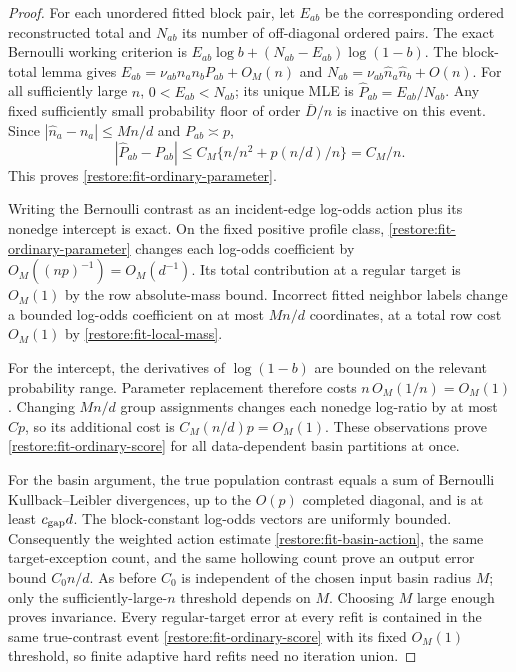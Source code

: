 \begin{proof}
For each unordered fitted block pair, let $E_{ab}$ be the corresponding
ordered reconstructed total and $N_{ab}$ its number of off-diagonal
ordered pairs. The exact Bernoulli working criterion is
$E_{ab}\log b+(N_{ab}-E_{ab})\log(1-b)$.
The block-total lemma gives
$E_{ab}=\nu_{ab}n_an_bP_{ab}+O_M(n)$ and
$N_{ab}=\nu_{ab}\widehat n_a\widehat n_b+O(n)$.
For all sufficiently large $n$, $0<E_{ab}<N_{ab}$; its unique MLE is
$\widehat P_{ab}=E_{ab}/N_{ab}$.
Any fixed sufficiently small probability floor of order $\overline D/n$
is inactive on this event. Since
$|\widehat n_a-n_a|\le Mn/d$ and $P_{ab}\asymp p$,
\[
 |\widehat P_{ab}-P_{ab}|
 \le C_M\{n/n^2+p(n/d)/n\}=C_M/n.
\]
This proves \eqref{restore:fit-ordinary-parameter}.

Writing the Bernoulli contrast as an incident-edge log-odds action
plus its nonedge intercept is exact. On the fixed positive profile
class, \eqref{restore:fit-ordinary-parameter} changes each log-odds
coefficient by $O_M((np)^{-1})=O_M(d^{-1})$.
Its total contribution at a regular target is $O_M(1)$ by the row
absolute-mass bound. Incorrect fitted neighbor labels change a bounded
log-odds coefficient on at most $Mn/d$ coordinates, at a total row
cost $O_M(1)$ by \cref{restore:fit-local-mass}.

For the intercept, the derivatives of $\log(1-b)$ are bounded on
the relevant probability range. Parameter replacement therefore costs
$n\,O_M(1/n)=O_M(1)$. Changing $Mn/d$ group assignments changes
each nonedge log-ratio by at most $Cp$, so its additional cost is
$C_M(n/d)p=O_M(1)$. These observations prove
\eqref{restore:fit-ordinary-score} for all data-dependent basin
partitions at once.

For the basin argument, the true population contrast equals a sum
of Bernoulli Kullback--Leibler divergences, up to the $O(p)$ completed
diagonal, and is at least $c_{\rm gap}d$.
The block-constant log-odds vectors are uniformly bounded.
Consequently the weighted action estimate
\eqref{restore:fit-basin-action}, the same target-exception count,
and the same hollowing count prove an output error bound $C_0n/d$.
As before $C_0$ is independent of the chosen input basin radius $M$;
only the sufficiently-large-$n$ threshold depends on $M$.
Choosing $M$ large enough proves invariance. Every regular-target
error at every refit is contained in the same true-contrast event
\eqref{restore:fit-ordinary-score} with its fixed $O_M(1)$ threshold,
so finite adaptive hard refits need no iteration union.
\end{proof}

